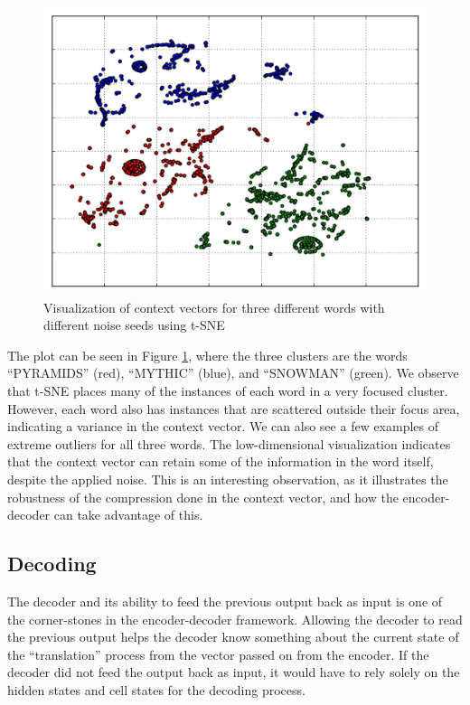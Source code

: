 \begin{figure}[!ht]
    \centering
    \includegraphics[width=.8\textwidth]{fig/results/context_exact.png}
    \captionsetup{justification=centering}
    \caption{Visualization of context vectors for three different words with different noise seeds using t-SNE}
    \label{fig:context_vector_plot}
\end{figure}

The plot can be seen in Figure \ref{fig:context_vector_plot}, where the three clusters are the words ``PYRAMIDS'' (red), ``MYTHIC'' (blue), and ``SNOWMAN'' (green). We observe that t-SNE places many of the instances of each word in a very focused cluster. However, each word also has instances that are scattered outside their focus area, indicating a variance in the context vector. We can also see a few examples of extreme outliers for all three words. The low-dimensional visualization indicates that the context vector can retain some of the information in the word itself, despite the applied noise. This is an interesting observation, as it illustrates the robustness of the compression done in the context vector, and how the encoder-decoder can take advantage of this.

\subsection{Decoding}
The decoder and its ability to feed the previous output back as input is one of the corner-stones in the encoder-decoder framework. Allowing the decoder to read the previous output helps the decoder know something about the current state of the ``translation'' process from the vector passed on from the encoder. If the decoder did not feed the output back as input, it would have to rely solely on the hidden states and cell states for the decoding process.

